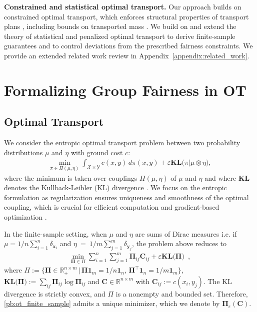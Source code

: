 \documentclass{article}
\newcommand{\kl}{\mathbf{KL}}
\theoremstyle{definition}
\begin{document}
\textbf{Constrained and statistical optimal transport.}
Our approach builds on constrained optimal transport, which enforces structural properties of transport plans \citep{courty2016optimal,alvarez2017structured,blondel2018smooth,paty2019subspace,scetbon2021equitable,liu2022sparsity,manupriya2024submodular}, including bounds on transported mass \citep{korman2015optimal}.
We build on and extend the theory of statistical and penalized optimal transport \citep{rakotomamonjy2015generalized,genevay2019sample,rigollet2022sample} to derive finite-sample guarantees and to control deviations from the prescribed fairness constraints. We provide an extended related work review in Appendix~\ref{appendix:related_work}.
\section{Formalizing Group Fairness in OT}
\subsection{Optimal Transport}
We consider the entropic optimal transport problem \citep{peyre2019computational,genevay2019sample,feydy2019interpolating,pooladian2021entropic,keriven2022entropic} between two probability distributions $\mu$ and $\eta$ with ground cost $c$:
\begin{align*}
    \min\limits_{\pi \in \Pi(\mu,\eta)} \int_{\mathcal{X}\times\mathcal{Y}} c(x,y)\,d\pi(x,y) + \varepsilon \kl\big(\pi | \mu \otimes \eta \big),
\end{align*}
where the minimum is taken over couplings $\Pi(\mu,\eta)$ of $\mu$ and $\eta$ and where $\kl$ denotes the Kullback-Leibler (KL) divergence \citep{CSZISAR_SUBDIFF}. We focus on the entropic formulation as regularization ensures uniqueness and smoothness of the optimal coupling, which is crucial for efficient computation and gradient-based optimization \citep{peyre2019computational}.

In the finite-sample setting, when $\mu$ and $\eta$ are sums of Dirac measures i.e. if $\mu = 1/n\sum_{i=1}^n  \delta_{\mathbf{x}_i}$ and $\eta~=~1/m\sum_{j=1}^m \delta_{\mathbf{y}_j}$, the problem above reduces to
\begin{align}\label{pb:ot_finite_sample}
    \min\limits_{\mathbf{\Pi} \in \Pi} \sum_{i=1}^n \sum_{j=1}^m \mathbf{\Pi}_{ij} \mathbf{C}_{ij} +\varepsilon\kl\big(\mathbf{\Pi}\big)\enspace,
\end{align}
where $\Pi := \big\{ \mathbf{\Pi} \in \mathbb{R}_+^{n \times m}\,|\, \mathbf{\Pi}\mathbf{1}_m= 1/n\mathbf{1}_n,\, \mathbf{\Pi}^\top\mathbf{1}_n = 1/m\mathbf{1}_m \big\}$, $\kl\big(\mathbf{\Pi}\big) := \sum_{ij}\mathbf{\Pi}_{ij}\log \mathbf{\Pi}_{ij} $ and $\mathbf{C}\in\mathbb{R}^{n\times m}$ with $\mathbf{C}_{ij}:=c(x_i,y_j)$. The KL divergence is strictly convex, and $\Pi$ is a nonempty and bounded set. Therefore, \eqref{pb:ot_finite_sample} admits a unique minimizer, which we denote by $\mathbf{\Pi}_{\varepsilon} (\mathbf{C})$.
\end{document}
